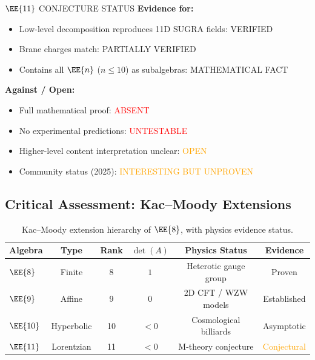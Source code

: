 \begin{factcheck}{$\EE{11}$ CONJECTURE STATUS}
\textbf{Evidence for:}
\begin{itemize}
    \item Low-level decomposition reproduces 11D SUGRA fields:
          \textcolor{validcolor}{VERIFIED}~\cite{west2001e11}
    \item Brane charges match: \textcolor{validcolor}{PARTIALLY VERIFIED}
    \item Contains all $\EE{n}$ ($n \le 10$) as subalgebras:
          \textcolor{validcolor}{MATHEMATICAL FACT}
\end{itemize}

\textbf{Against / Open:}
\begin{itemize}
    \item Full mathematical proof: \textcolor{red}{ABSENT}
    \item No experimental predictions: \textcolor{red}{UNTESTABLE}
    \item Higher-level content interpretation unclear:
          \textcolor{orange}{OPEN}
    \item Community status (2025): \textcolor{orange}{INTERESTING BUT
          UNPROVEN}
\end{itemize}
\end{factcheck}

\subsection{Critical Assessment: Kac--Moody Extensions}

\begin{table}[ht]
\centering
\begin{tabular}{lccccc}
\toprule
Algebra & Type & Rank & $\det(A)$ & Physics Status & Evidence \\
\midrule
$\EE{8}$  & Finite      & 8  & $1$  & Heterotic gauge group
    & \textcolor{validcolor}{Proven} \\
$\EE{9}$  & Affine      & 9  & $0$  & 2D CFT / WZW models
    & \textcolor{validcolor}{Established} \\
$\EE{10}$ & Hyperbolic  & 10 & $<0$ & Cosmological billiards
    & \textcolor{validcolor}{Asymptotic} \\
$\EE{11}$ & Lorentzian  & 11 & $<0$ & M-theory conjecture
    & \textcolor{orange}{Conjectural} \\
\bottomrule
\end{tabular}
\caption{Kac--Moody extension hierarchy of $\EE{8}$, with physics evidence status.}
\label{tab:kac_moody_hierarchy}
\end{table}

